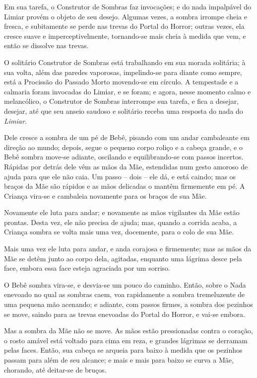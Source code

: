Em sua tarefa, o Construtor de Sombras faz invocações; e do nada
impalpável do Limiar provém o objeto de seu desejo. Algumas vezes, a
sombra irrompe cheia e fresca, e subitamente se perde nas trevas do
Portal do Horror; outras vezes, ela cresce suave e imperceptivelmente,
tornando-se mais cheia à medida que vem, e então se dissolve nas trevas.

\smallskip
O solitário Construtor de Sombras está trabalhando em sua morada
solitária; à sua volta, além das paredes vaporosas, impelindo-se para
diante como sempre, está a Procissão do Passado Morto movendo-se em
círculo. A tempestade e a calmaria foram invocadas do Limiar, e se
foram; e agora, nesse momento calmo e melancólico, o Construtor de
Sombras interrompe sua tarefa, e fica a desejar, desejar, até que seu
anseio saudoso e solitário receba uma resposta do nada do
\emph{Limiar}.

Dele cresce a sombra de um pé de Bebê, pisando com um andar cambaleante
em direção ao mundo; depois, segue o pequeno corpo roliço e a cabeça
grande, e o Bebê sombra move-se adiante, oscilando e equilibrando-se com
passos incertos. Rápidas por detrás dele vêm as mãos da Mãe, estendidas
num gesto amoroso de ajuda para que ele não caia. Um passo -- dois --
ele dá, e está caindo; mas os braços da Mãe são rápidos e as mãos
delicadas o mantêm firmemente em pé. A Criança vira-se e cambaleia
novamente para os braços de sua Mãe.

Novamente ele luta para andar; e novamente as mãos vigilantes da Mãe
estão prontas. Desta vez, ele não precisa de ajuda; mas, quando a
corrida acaba, a Criança sombra se volta mais uma vez, docemente, para o
colo de sua Mãe.

Mais uma vez ele luta para andar, e anda corajosa e firmemente; mas as
mãos da Mãe se detêm junto ao corpo dela, agitadas, enquanto uma lágrima
desce pela face, embora essa face esteja agraciada por um sorriso.

O Bebê sombra vira-se, e desvia-se um pouco do caminho. Então, sobre o
Nada enevoado no qual as sombras caem, voa rapidamente a sombra
tremeluzente de uma pequena mão acenando; e adiante, com passos firmes,
a sombra dos pezinhos se move, saindo para as trevas enevoadas do Portal
do Horror, e vai-se embora.

Mas a sombra da Mãe não se move. As mãos estão pressionadas contra o
coração, o rosto amável está voltado para cima em reza, e grandes
lágrimas se derramam pelas faces. Então, sua cabeça se arqueia para
baixo à medida que os pezinhos passam para além de seu alcance; e mais e
mais para baixo se curva a Mãe, chorando, até deitar-se de bruços.

